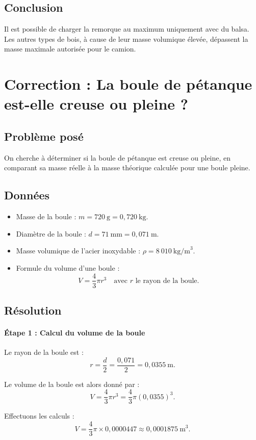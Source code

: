 \documentclass[a4paper,12pt]{article}
\begin{document}
\subsection*{Conclusion}
Il est possible de charger la remorque au maximum uniquement avec du balsa. Les autres types de bois, à cause de leur masse volumique élevée, dépassent la masse maximale autorisée pour le camion.


\section*{Correction : La boule de pétanque est-elle creuse ou pleine ?}

\subsection*{Problème posé}
On cherche à déterminer si la boule de pétanque est creuse ou pleine, en comparant sa masse réelle à la masse théorique calculée pour une boule pleine.

\subsection*{Données}
\begin{itemize}
    \item Masse de la boule : $m = 720~\text{g} = 0,720~\text{kg}$.
    \item Diamètre de la boule : $d = 71~\text{mm} = 0,071~\text{m}$.
    \item Masse volumique de l'acier inoxydable : $\rho = 8~010~\text{kg/m}^3$.
    \item Formule du volume d'une boule :
    \[
    V = \frac{4}{3} \pi r^3 \quad \text{avec } r \text{ le rayon de la boule.}
    \]
\end{itemize}

\subsection*{Résolution}
\paragraph{Étape 1 : Calcul du volume de la boule}
Le rayon de la boule est :
\[
r = \frac{d}{2} = \frac{0,071}{2} = 0,0355~\text{m}.
\]

Le volume de la boule est alors donné par :
\[
V = \frac{4}{3} \pi r^3 = \frac{4}{3} \pi (0,0355)^3.
\]

Effectuons les calculs :
\[
V = \frac{4}{3} \pi \times 0,0000447 \approx 0,0001875~\text{m}^3.
\]
\end{document}
